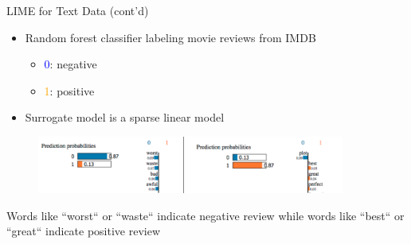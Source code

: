 \documentclass[10pt,compress,t,notes=noshow, xcolor=table]{beamer}
\begin{document}
\begin{frame}{LIME for Text Data (cont'd) }	 
	\begin{itemize}
		\item Random forest classifier labeling movie reviews from IMDB 
		\begin{itemize}
		    \item \textcolor{blue}{0}: negative
		    \item \textcolor{orange}{1}: positive
		\end{itemize}
		\item Surrogate model is a sparse linear model 
	\end{itemize}
	
	\begin{figure}
		\begin{center}
			\includegraphics[width=0.9\textwidth]{figure/lime_movier}
		\end{center}
	\end{figure}
	
	{Words like ``worst`` or ``waste`` indicate negative review while words like ``best`` or ``great`` indicate positive review}
	
	\end{frame}
	
\end{document}
